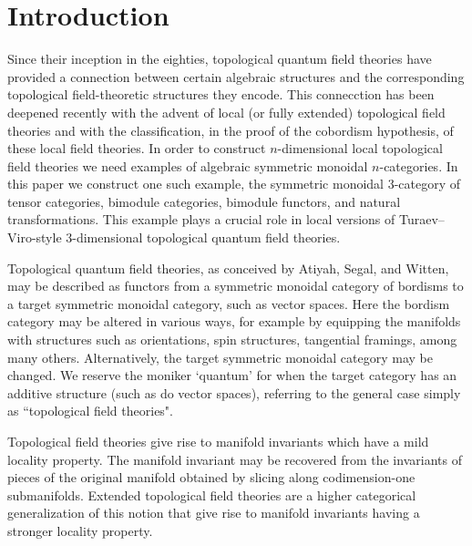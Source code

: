 \documentclass[a4paper]{amsart}
\begin{document}
\setcounter{tocdepth}{3}
\tableofcontents




\section{Introduction}
Since their inception in the eighties, topological quantum field theories have provided a connection between certain algebraic structures and the corresponding topological field-theoretic structures they encode. This connecction has been deepened recently with the advent of local (or fully extended) topological field theories and with the classification, in the proof of the cobordism hypothesis, of these local field theories.  In order to construct $n$-dimensional local topological field theories we need examples of algebraic symmetric monoidal $n$-categories.  In this paper we construct one such example, the symmetric monoidal $3$-category of tensor categories, bimodule categories, bimodule functors, and natural transformations.  This example plays a crucial role in local versions of Turaev--Viro-style $3$-dimensional topological quantum field theories.  %

Topological quantum field theories, as conceived by Atiyah, Segal, and Witten, may be described as functors from a symmetric monoidal category of bordisms to a target symmetric monoidal category, such as vector spaces.  Here the bordism category may be altered in various ways, for example by equipping the manifolds with structures such as orientations, spin structures, tangential framings, among many others.  Alternatively, the target symmetric monoidal category may be changed. We reserve the moniker `quantum' for when the target category has an additive structure (such as do vector spaces), referring to the general case simply as ``topological field theories".

Topological field theories give rise to manifold invariants which have a mild locality property. The manifold invariant may be recovered from the invariants of pieces of the original manifold obtained by slicing along codimension-one submanifolds. Extended topological field theories are a higher categorical generalization of this notion that give rise to manifold invariants having a stronger locality property. 
\end{document}
